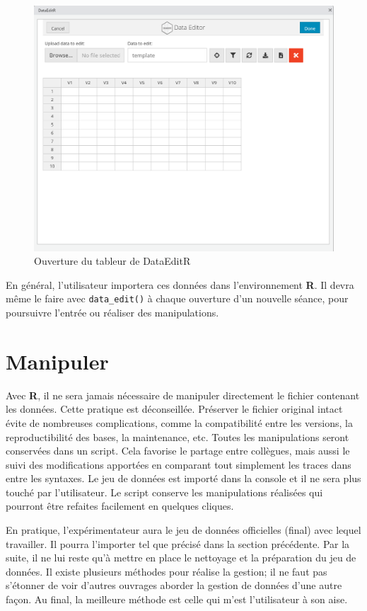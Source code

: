 \documentclass[
]{book}
\begin{document}
\begin{figure}

{\centering \includegraphics[width=0.75\linewidth]{image//editR} 

}

\caption{Ouverture du tableur de DataEditR}\label{fig:editr}
\end{figure}

En général, l'utilisateur importera ces données dans l'environnement \textbf{R}. Il devra même le faire avec \texttt{data\_edit()} à chaque ouverture d'un nouvelle séance, pour poursuivre l'entrée ou réaliser des manipulations.

\hypertarget{manipuler}{%
\chapter{Manipuler}\label{manipuler}}

Avec \textbf{R}, il ne sera jamais nécessaire de manipuler directement le fichier contenant les données. Cette pratique est déconseillée. Préserver le fichier original intact évite de nombreuses complications, comme la compatibilité entre les versions, la reproductibilité des bases, la maintenance, etc. Toutes les manipulations seront conservées dans un script. Cela favorise le partage entre collègues, mais aussi le suivi des modifications apportées en comparant tout simplement les traces dans entre les syntaxes. Le jeu de données est importé dans la console et il ne sera plus touché par l'utilisateur. Le script conserve les manipulations réalisées qui pourront être refaites facilement en quelques cliques.

En pratique, l'expérimentateur aura le jeu de données officielles (final) avec lequel travailler. Il pourra l'importer tel que précisé dans la section précédente. Par la suite, il ne lui reste qu'à mettre en place le nettoyage et la préparation du jeu de données. Il existe plusieurs méthodes pour réalise la gestion; il ne faut pas s'étonner de voir d'autres ouvrages aborder la gestion de données d'une autre façon. Au final, la meilleure méthode est celle qui m'est l'utilisateur à son aise.
\end{document}
